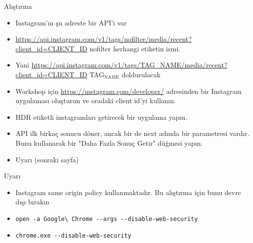 \documentclass[presentation]{beamer}
\begin{document}
\begin{frame}[label=sec-8]{Alıştırma}
\begin{itemize}
\item Instagram'ın şu adreste bir API'i var
\item \url{https://api.instagram.com/v1/tags/nofilter/media/recent?client_id=CLIENT_ID}
  nofilter herhangi etiketin ismi.
\item Yani
\url{https://api.instagram.com/v1/tags/TAG_NAME/media/recent?client_id=CLIENT_ID}
TAG$_{\text{NAME}}$ doldurulacak
\item Workshop için \url{https://ınstagram.çom/developer/} adresinden bir Instagram
uygulaması oluşturun ve oradaki client id'yi kullanın.
\item HDR etiketli instagramları getirecek bir uygulama yapın.
\item API ilk birkaç sonucu döner, ancak bir de next adında bir parametresi
vardır. Bunu kullanarak bir "Daha Fazla Sonuç Getir" düğmesi yapın.
\item Uyarı (sonraki sayfa)
\end{itemize}
\end{frame}

\begin{frame}[fragile,label=sec-9]{Uyarı}
 \begin{itemize}
\item Instagram same origin policy kullanmaktadır. Bu alıştırma için bunu devre
dışı bırakın
\item \verb~open -a Google\ Chrome --args --disable-web-security~
\item \texttt{chrome.exe -{}-disable-web-security}
\end{itemize}
\end{frame}
\end{document}
